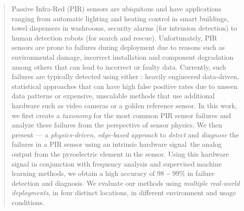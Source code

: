 \begin{abstract}
	Passive Infra-Red (PIR) sensors are ubiquitous and have applications ranging from automatic lighting and heating control in smart buildings,  towel dispensers in washrooms, security alarms (for intrusion detection) to human detection robots (for search and rescue). 
	Unfortunately, PIR sensors are prone to failures during deployment due to reasons such as environmental damage, incorrect installation and component degradation among others that can lead to incorrect or faulty data. 
	Currently, such failures are typically detected using either : \ca heavily engineered data-driven, statistical approaches that can have high false positive rates due to unseen data patterns or \cb expensive, unscalable methods that use additional hardware such as video cameras or a golden reference sensor.
	In this work, we first create a \textit{taxonomy} for the most common PIR sensor failures and analyze these failures from the perspective of sensor physics.
	We then present \sol --- a \textit{physics-driven, edge-based approach} to \textit{detect} and \textit{diagnose} the failures in a PIR sensor using an intrinsic hardware signal~\viz the analog output from the pyroelectric element in the sensor. 
	Using this hardware signal in conjunction with frequency analysis and supervised machine learning methods, we obtain a high accuracy of $98-99 \%$ in failure detection and diagnosis. 
	We evaluate our methods using \textit{multiple real-world deployments}, in four distinct locations, in different environment and usage conditions.    
\end{abstract}
